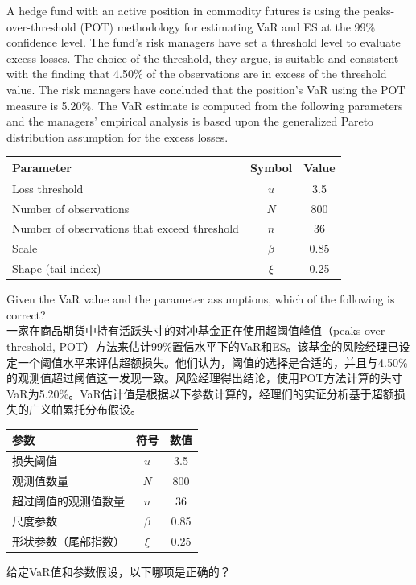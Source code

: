 \documentclass{article}
\newcounter{question} %
\begin{document}
\begin{question}
    A hedge fund with an active position in commodity futures is using the peaks-over-threshold (POT) methodology for estimating VaR and ES at the 99\% confidence level. The fund's risk managers have set a threshold level to evaluate excess losses. The choice of the threshold, they argue, is suitable and consistent with the finding that 4.50\% of the observations are in excess of the threshold value. The risk managers have concluded that the position's VaR using the POT measure is 5.20\%. The VaR estimate is computed from the following parameters and the managers' empirical analysis is based upon the generalized Pareto distribution assumption for the excess losses.
     
    \begin{table}[H]
        \centering
        \begin{tabular}{|l|c|c|}
        \hline
        \textbf{Parameter} & \textbf{Symbol} & \textbf{Value} \\
        \hline
        Loss threshold & $u$ & 3.5 \\
        Number of observations & $N$ & 800 \\
        Number of observations that exceed threshold & $n$ & 36 \\
        Scale & $\beta$ & 0.85 \\
        Shape (tail index) & $\xi$ & 0.25 \\
        \hline
        \end{tabular}
    \end{table}
    
    Given the VaR value and the parameter assumptions, which of the following is correct?
    \\一家在商品期货中持有活跃头寸的对冲基金正在使用超阈值峰值（peaks-over-threshold, POT）方法来估计99\%置信水平下的VaR和ES。该基金的风险经理已设定一个阈值水平来评估超额损失。他们认为，阈值的选择是合适的，并且与4.50\%的观测值超过阈值这一发现一致。风险经理得出结论，使用POT方法计算的头寸VaR为5.20\%。VaR估计值是根据以下参数计算的，经理们的实证分析基于超额损失的广义帕累托分布假设。
     
    \begin{table}[H]
        \centering
        \begin{tabular}{|l|c|c|}
        \hline
        \textbf{参数} & \textbf{符号} & \textbf{数值} \\
        \hline
        损失阈值 & $u$ & 3.5 \\
        观测值数量 & $N$ & 800 \\
        超过阈值的观测值数量 & $n$ & 36 \\
        尺度参数 & $\beta$ & 0.85 \\
        形状参数（尾部指数） & $\xi$ & 0.25 \\
        \hline
        \end{tabular}
    \end{table}
    
    给定VaR值和参数假设，以下哪项是正确的？

\end{question}
\end{document}
